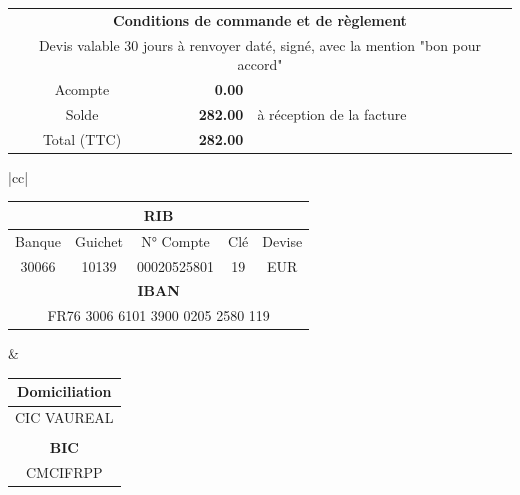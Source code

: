 \documentclass[11pt,french]{article}
\def\Total{282.00}
\def\totalLeft{282.00}
\def\deposit{0.00}
\begin{document}
\vfill
\vfill
\begin{center}
\begin{tabular}{|crl|}
	\hline
	\multicolumn{3}{|c|}{\textbf{Conditions de commande et de règlement}} \\
	\multicolumn{3}{|c|}{Devis valable 30 jours à renvoyer daté, signé, avec la mention "bon pour accord"} \\
	Acompte & \textbf{\deposit \EUR} & \\
	Solde &	\textbf{\Total \EUR} & à réception de la facture \\
	Total (TTC) & \textbf{\totalLeft \EUR} & \\
	\hline
\end{tabular}
\begin{tabular}{|cc|}
	\hline
	\begin{minipage}{10cm}
	\begin{center}
		\begin{tabular}{ccccc}
		 	\multicolumn{5}{c}{\textbf{RIB}} \\
		 	\hline
			Banque & Guichet & N° Compte & Clé & Devise \\
			30066  & 10139 & 00020525801 & 19 & EUR \\ 
			\multicolumn{5}{c}{\textbf{IBAN}} \\
			\hline
			\multicolumn{5}{c}{FR76 3006 6101 3900 0205 2580 119}
		\end{tabular}
	\end{center}
	\end{minipage} &
	\begin{minipage}{7cm}
	\begin{center}
	\begin{tabular}{c}
		\textbf{Domiciliation} \\ \hline
		CIC VAUREAL \\
		\\
		\textbf{BIC} \\ \hline
		CMCIFRPP
	\end{tabular}
	\end{center}
	\end{minipage} \\ \hline \hline


\end{tabular}
\end{center}
\end{document}
